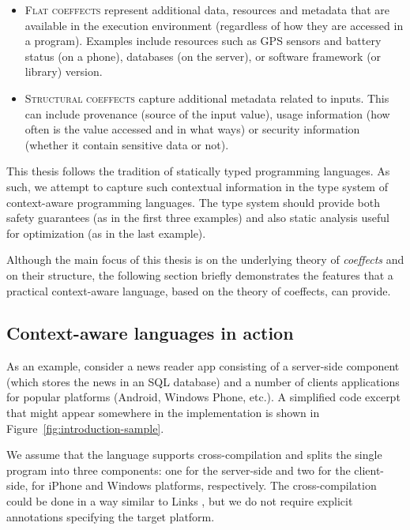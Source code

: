 \begin{itemize}
\item \textsc{Flat coeffects} represent additional data, resources and metadata that are
   available in the execution environment (regardless of how they are accessed in a program).
   Examples include resources such as GPS sensors and battery status (on a phone), databases
   (on the server), or software framework (or library) version.

\item \textsc{Structural coeffects} capture additional metadata related to inputs. This can include
   provenance (source of the input value), usage information (how often is the value
   accessed and in what ways) or security information (whether it contain sensitive data or not).
\end{itemize}
%
This thesis follows the tradition of statically typed programming languages. As such, we
attempt to capture such contextual information in the type system of context-aware programming
languages. The type system should provide both safety guarantees (as in the first three examples)
and also static analysis useful for optimization (as in the last example).

Although the main focus of this thesis is on the underlying theory of \emph{coeffects} and on
their structure, the following section briefly demonstrates the features that a practical
context-aware language, based on the theory of coeffects, can provide.


\subsection{Context-aware languages in action}
\label{sec:intro-context-example}

As an example, consider a news reader app consisting of a server-side component (which stores the
news in an SQL database) and a number of clients applications for popular platforms (Android, Windows
Phone, etc.). A simplified code excerpt that might appear somewhere in the implementation is shown in
Figure~\ref{fig:introduction-sample}.

We assume that the language supports cross-compilation and splits the single program into three
components: one for the server-side and two for the client-side, for iPhone and Windows platforms,
respectively. The cross-compilation could be done in a way similar to Links \cite{app-distributed-links},
but we do not require explicit annotations specifying the target platform.


